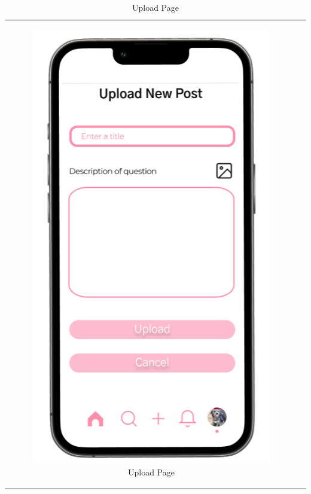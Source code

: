\begin{longtable}{@{}cc@{}}
\begin{subfigure}{.5\textwidth}
        \includegraphics[width=.8\linewidth]{Figures/upload.png}
        \caption{\footnotesize Upload Page}
        \label{fig:upload}
    \end{subfigure} \\
    

\end{longtable}
